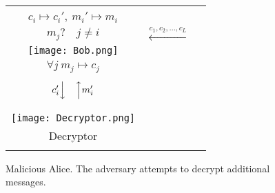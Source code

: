 \documentclass[10pt,journal]{IEEEtran}
\begin{document}
\begin{figure}[!t]
\centering
\begin{tabular}{ccc}
\color{red}
\Ovalbox{\begin{minipage}{0.3\columnwidth}
\centering
Adversary\\
$c_i \mapsto c_i', ~ m_i' \mapsto m_i$\\
$m_j? \quad j \neq i$
\end{minipage}
}
& $\overset{c_1,c_2,\ldots,c_L}{\longleftarrow}$ & 
\ovalbox{\begin{minipage}{0.3\columnwidth}
\centering
Encryptor\\
\vspace{0.1cm}
\texttt{[image: Bob.png]}\\
$\forall j~m_j \mapsto c_j$
\end{minipage}
}\\
 & & \\
$c_i' \Big\downarrow \quad \Big\uparrow m_i'$ & & \\
 & & \\
\ovalbox{\begin{minipage}{0.3\columnwidth}
\centering
$c_i' \mapsto m_i'$\\
\vspace{0.1cm}
\texttt{[image: Decryptor.png]}\\
\vspace{-0.1cm}
Decryptor\\
\end{minipage}
}
\end{tabular}
\caption{Malicious Alice. The adversary attempts to decrypt additional messages.}
\label{fig:adversary_alice}
\end{figure}
\end{document}
